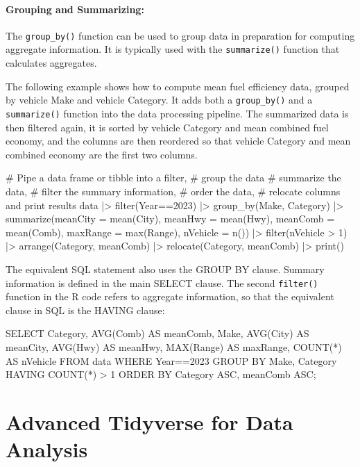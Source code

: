 \paragraph*{Grouping and Summarizing:} The \texttt{group\_by()} function can be used to group data in preparation for computing aggregate information. It is typically used with the \texttt{summarize()} function that calculates aggregates. 

The following example shows how to compute mean fuel efficiency data, grouped by vehicle Make and vehicle Category. It adds both a \texttt{group\_by()} and a \texttt{summarize()} function into the data processing pipeline. The summarized data is then filtered again, it is sorted by vehicle Category and mean combined fuel economy, and the columns are then reordered so that vehicle Category and mean combined economy are the first two columns.

\begin{samepage}
\begin{Rcode}
# Pipe a data frame or tibble into a filter,
# group the data
# summarize the data,
# filter the summary information,
# order the data,
# relocate columns and print results
data |> 
  filter(Year==2023) |> 
  group_by(Make, Category) |>
  summarize(meanCity = mean(City), 
            meanHwy = mean(Hwy),
            meanComb = mean(Comb),
            maxRange = max(Range),
            nVehicle = n()) |>
  filter(nVehicle > 1) |>
  arrange(Category, meanComb) |>
  relocate(Category, meanComb) |>
  print()
\end{Rcode}
\end{samepage}

The equivalent SQL statement also uses the GROUP BY clause. Summary information is defined in the main SELECT clause. The second \texttt{filter()} function in the R code refers to aggregate information, so that the equivalent clause in SQL is the HAVING clause:

\begin{samepage}
\begin{sqlcode}
SELECT Category, 
       AVG(Comb) AS meanComb,
       Make,
       AVG(City) AS meanCity,
       AVG(Hwy) AS meanHwy,
       MAX(Range) AS maxRange,
       COUNT(*) AS nVehicle
   FROM data 
   WHERE Year==2023
   GROUP BY Make, Category
   HAVING COUNT(*) > 1
   ORDER BY Category ASC, meanComb ASC;
\end{sqlcode}
\end{samepage}

\section{Advanced Tidyverse for Data Analysis}

